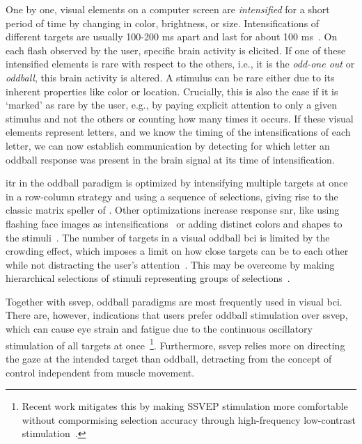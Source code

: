 One by one, visual elements on a computer screen are \emph{intensified} for a short
period of time by changing in color, brightness, or size.
Intensifications of different targets are usually 100-200 ms apart and last for about
100 ms~\cite{Sellers2006a}.
On each flash observed by the user, specific brain activity is elicited.
If one of these intensified elements is rare with respect to the others, i.e., it is the
\emph{odd-one out} or \emph{oddball}, this brain activity is altered.
A stimulus can be rare either due to its inherent properties like color or location.
Crucially, this is also the case if it is `marked' as rare by the user, e.g., by paying
explicit attention to only a given stimulus and not the others or counting how many
times it occurs.
If these visual elements represent letters, and we know the timing of the
intensifications of each letter, we can now establish communication by detecting for
which letter an oddball response was present in the brain signal at its time of
intensification.

\Ac{itr} in the oddball paradigm is optimized by intensifying multiple targets at once
in a row-column strategy and using a sequence of selections, giving rise to the classic
matrix speller of \textcite{Farwell1988}.
Other optimizations increase response \ac{snr}, like using flashing face images as
intensifications~\cite{Jin2012} or adding distinct colors and shapes to the
stimuli~\cite{Treder2011}.
The number of targets in a visual oddball \ac{bci} is limited by the crowding effect,
which imposes a limit on how close targets can be to each other while not distracting
the user's attention~\cite{Sellers2006a,Li2010}.
This may be overcome by making hierarchical selections of stimuli representing groups
of selections~\cite{Treder2010}.

Together with \ac{ssvep}, oddball paradigms are most frequently used in visual \ac{bci}.
There are, however, indications that users prefer oddball stimulation over \ac{ssvep},
which can cause eye strain and fatigue due to the continuous oscillatory stimulation of
all targets at once~\cite{Xu2021}\footnote{
  Recent work mitigates this by making SSVEP stimulation
  more comfortable without compormising selection accuracy through
  high-frequency low-contrast stimulation~\cite{Ladouce2022}.
}.
Furthermore, \ac{ssvep} relies more on directing the gaze at the intended target than
oddball, detracting from the concept of control independent from muscle movement.

